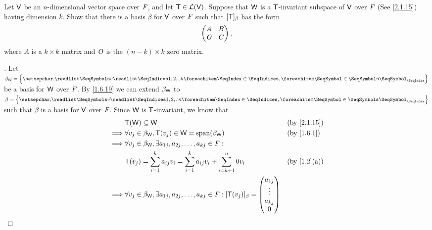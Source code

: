 \begin{ex}\label{ex:2.2.11}
	Let \(\mathsf{V}\) be an \(n\)-dimensional vector space over \(\mathit{F}\), and let \(\mathsf{T} \in \mathcal{L}(\mathsf{V})\).
	Suppose that \(\mathsf{W}\) is a \(\mathsf{T}\)-invariant subspace of \(\mathsf{V}\) over \(\mathit{F}\) (See \cref{2.1.15}) having dimension \(k\).
	Show that there is a basis \(\beta\) for \(\mathsf{V}\) over \(\mathit{F}\) such that \([\mathsf{T}]_{\beta}\) has the form
	\[
		\begin{pmatrix}
			A   & B \\
			\mathit{O} & C
		\end{pmatrix},
	\]
	where \(A\) is a \(k \times k\) matrix and \(\mathit{O}\) is the \((n - k) \times k\) zero matrix.
\end{ex}

\begin{proof}[]
	Let \(\beta_{\W} = \set{\seq{v}{1,2,,k}}\) be a basis for \(\mathsf{W}\) over \(\mathit{F}\).
	By \cref{1.6.19} we can extend \(\beta_{\mathsf{W}}\) to \(\beta = \set{\seq{v}{1,2,,n}}\) such that \(\beta\) is a basis for \(\mathsf{V}\) over \(\mathit{F}\).
	Since \(\mathsf{W}\) is \(\mathsf{T}\)-invariant, we know that
	\begin{align*}
		         & \T(\W) \subseteq \W                                                                                               &  & \by{2.1.15} \\
		\implies & \forall v_j \in \beta_{\W}, \T(v_j) \in \W = \spn{\beta_{\W}}                                                     &  & \by{1.6.1}  \\
		\implies & \forall v_j \in \beta_{\W}, \exists a_{1 j}, a_{2 j}, \dots, a_{k j} \in \F :                                                      \\
		         & \T(v_j) = \sum_{i = 1}^k a_{i j} v_i = \sum_{i = 1}^k a_{i j} v_i + \sum_{i = k + 1}^n 0 v_i                      &  & \by{1.2}[a] \\
		\implies & \forall v_j \in \beta_{\W}, \exists a_{1 j}, a_{2 j}, \dots, a_{k j} \in \F : [\T(v_j)]_{\beta} = \begin{pmatrix}
			                                                                                                             a_{1 j} \\
			                                                                                                             \vdots  \\
			                                                                                                             a_{k j} \\
			                                                                                                             0       \\

\end{pmatrix}
\end{align*}
\end{proof}
